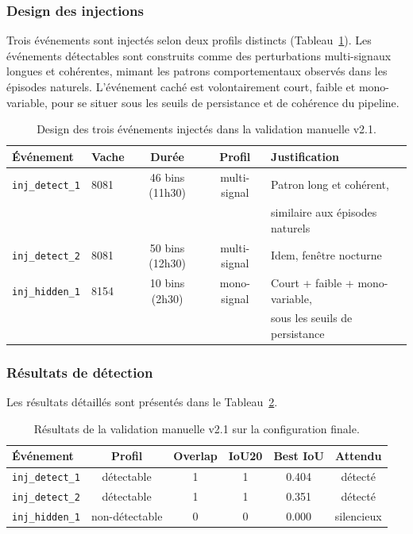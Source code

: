 \subsubsection{Design des injections}

Trois événements sont injectés selon deux profils distincts
(Tableau~\ref{tab:injection_design}). Les événements détectables sont construits
comme des perturbations multi-signaux longues et cohérentes, mimant les patrons
comportementaux observés dans les épisodes naturels. L'événement caché est
volontairement court, faible et mono-variable, pour se situer sous les seuils
de persistance et de cohérence du pipeline.

\begin{table}[H]
    \centering
    \caption{Design des trois événements injectés dans la validation manuelle v2.1.}
    \label{tab:injection_design}
    \small
    \begin{tabular}{llccl}
        \toprule
        \textbf{Événement} & \textbf{Vache} & \textbf{Durée}
            & \textbf{Profil} & \textbf{Justification} \\
        \midrule
        \texttt{inj\_detect\_1} & 8081 & 46 bins (11h30)
            & multi-signal & Patron long et cohérent, \\
        & & & & similaire aux épisodes naturels \\
        \addlinespace
        \texttt{inj\_detect\_2} & 8081 & 50 bins (12h30)
            & multi-signal & Idem, fenêtre nocturne \\
        \addlinespace
        \texttt{inj\_hidden\_1} & 8154 & 10 bins (2h30)
            & mono-signal & Court + faible + mono-variable, \\
        & & & & sous les seuils de persistance \\
        \bottomrule
    \end{tabular}
\end{table}

\subsubsection{Résultats de détection}

Les résultats détaillés sont présentés dans le Tableau~\ref{tab:manual_v21}.

\begin{table}[H]
    \centering
    \caption{Résultats de la validation manuelle v2.1 sur la configuration finale.}
    \label{tab:manual_v21}
    \begin{tabular}{lccccc}
        \toprule
        \textbf{Événement} & \textbf{Profil} & \textbf{Overlap} & \textbf{IoU20}
            & \textbf{Best IoU} & \textbf{Attendu} \\
        \midrule
        \texttt{inj\_detect\_1} & détectable & 1 & 1 & 0.404 & détecté \\
        \texttt{inj\_detect\_2} & détectable & 1 & 1 & 0.351 & détecté \\
        \texttt{inj\_hidden\_1} & non-détectable & 0 & 0 & 0.000 & silencieux \\
        \bottomrule
    \end{tabular}
\end{table}

